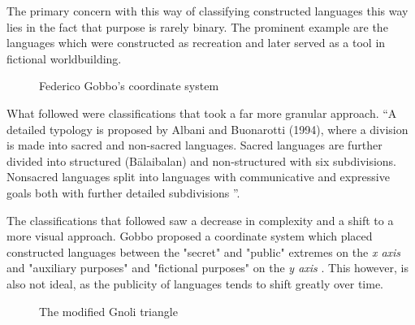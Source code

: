\documentclass[14pt, a4paper]{extreport}
\begin{document}
The primary concern with this way of classifying constructed languages this way lies in the fact that purpose is rarely binary. The prominent example are the languages which were constructed as recreation and later served as a tool in fictional worldbuilding.

\begin{figure}[ht]%
  \bigskip
  \centering
  \caption{Federico Gobbo's coordinate system}
\end{figure}%

What followed were classifications that took a far more granular approach. ``A detailed typology is proposed by Albani and Buonarotti (1994), where a division is made into sacred and non-sacred languages. Sacred languages are further divided into structured (Bālaibalan) and non-structured with six subdivisions. Nonsacred languages split into languages with communicative and expressive goals both with further detailed subdivisions \parencite[93]{stria}''.

The classifications that followed saw a decrease in complexity and a shift to a more visual approach. Gobbo proposed a coordinate system which placed constructed languages between the "secret" and "public" extremes on the \textit{x axis} and "auxiliary purposes" and "fictional purposes" on the \textit{y axis} \parencite{gobbo}. This however, is also not ideal, as the publicity of languages tends to shift greatly over time.

\begin{figure}[ht]%
  \bigskip
  \centering
  \caption{The modified Gnoli triangle}
\end{figure}%
\end{document}
